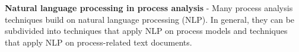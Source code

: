 \documentclass{scrartcl}
\begin{document}
\textbf{Natural language processing in process analysis} - Many process analysis techniques build on natural language processing (NLP). In general, they can be subdivided into techniques that apply NLP on process models and techniques that apply NLP on process-related text documents. 

%

\end{document}
